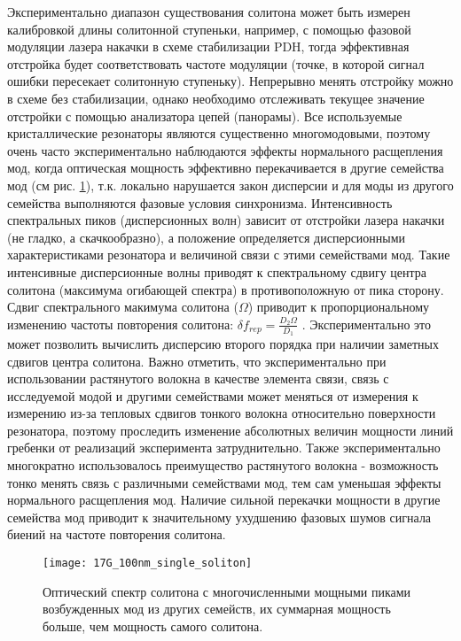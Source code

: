 Экспериментально диапазон существования солитона может быть измерен калибровкой длины солитонной ступеньки, например, с помощью фазовой модуляции лазера накачки в схеме стабилизации PDH, тогда эффективная отстройка будет соответствовать частоте модуляции (точке, в которой сигнал ошибки пересекает солитонную ступеньку). Непрерывно менять отстройку можно в схеме без стабилизации, однако необходимо отслеживать текущее значение отстройки с помощью анализатора цепей (панорамы). Все используемые кристаллические резонаторы являются существенно многомодовыми, поэтому очень часто экспериментально наблюдаются эффекты нормального расщепления мод, когда оптическая мощность эффективно перекачивается в другие семейства мод (см рис. \ref{17G_100nm_single_soliton_amx}), т.к. локально нарушается закон дисперсии и для моды из другого семейства выполняются фазовые условия синхронизма. Интенсивность спектральных пиков (дисперсионных волн) зависит от отстройки лазера накачки (не гладко, а скачкообразно), а положение определяется дисперсионными характеристиками резонатора и величиной связи с этими семействами мод. Такие интенсивные дисперсионные волны приводят к спектральному сдвигу центра солитона (максимума огибающей спектра) в противоположную от пика сторону. Сдвиг спектрального макимума солитона ($\Omega$) приводит к пропорциональному изменению частоты повторения солитона: $\delta f_{rep}=\frac{D_2\Omega}{D_1}$ \cite{Yang:16}. Экспериментально это может позволить вычислить дисперсию второго порядка при наличии заметных сдвигов центра солитона. Важно отметить, что экспериментально при использовании растянутого волокна в качестве элемента связи, связь с исследуемой модой и другими семействами может меняться от измерения к измерению из-за тепловых сдвигов тонкого волокна относительно поверхности резонатора, поэтому проследить изменение абсолютных величин мощности линий гребенки от реализаций эксперимента затруднительно. Также экспериментально многократно использовалось преимущество растянутого волокна - возможность тонко менять связь с различными семействами мод, тем сам уменьшая эффекты нормального расщепления мод. Наличие сильной перекачки мощности в другие семейства мод приводит к значительному ухудшению фазовых шумов сигнала биений на частоте повторения солитона.

\begin{figure}[ht]
\centering
  \texttt{[image: 17G\_100nm\_single\_soliton]}
  \caption{Оптический спектр солитона с многочисленными мощными пиками возбужденных мод из других семейств, их суммарная мощность больше, чем мощность самого солитона.}
  \label{17G_100nm_single_soliton_amx}
\end{figure}

